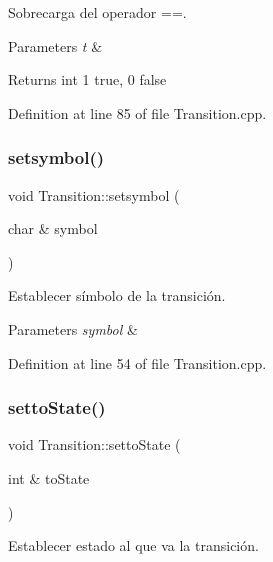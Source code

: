 Sobrecarga del operador ==. 


\begin{DoxyParams}{Parameters}
{\em t} & \\
\hline
\end{DoxyParams}
\begin{DoxyReturn}{Returns}
int 1 true, 0 false 
\end{DoxyReturn}


Definition at line 85 of file Transition.\+cpp.

\mbox{\label{class_transition_a5a20b15b7f4ab032742ad6391190cc6e}} 
\subsubsection{\texorpdfstring{setsymbol()}{setsymbol()}}
{\footnotesize\ttfamily void Transition\+::setsymbol (\begin{DoxyParamCaption}\item[{char \&}]{symbol }\end{DoxyParamCaption})}



Establecer símbolo de la transición. 


\begin{DoxyParams}{Parameters}
{\em symbol} & \\
\hline
\end{DoxyParams}


Definition at line 54 of file Transition.\+cpp.

\mbox{\label{class_transition_ab6247c399e434db72235b6764ff80d4e}} 
\subsubsection{\texorpdfstring{setto\+State()}{settoState()}}
{\footnotesize\ttfamily void Transition\+::setto\+State (\begin{DoxyParamCaption}\item[{int \&}]{to\+State }\end{DoxyParamCaption})}



Establecer estado al que va la transición. 


